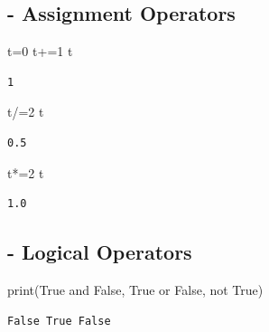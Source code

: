 \documentclass[
  a4paper,
  DIV=11,
  numbers=noendperiod]{scrreprt}
\newenvironment{Shaded}{\begin{snugshade}}{\end{snugshade}}
\newcommand{\BuiltInTok}[1]{\textcolor[rgb]{0.00,0.23,0.31}{#1}}
\newcommand{\DecValTok}[1]{\textcolor[rgb]{0.68,0.00,0.00}{#1}}
\newcommand{\KeywordTok}[1]{\textcolor[rgb]{0.00,0.23,0.31}{#1}}
\newcommand{\NormalTok}[1]{\textcolor[rgb]{0.00,0.23,0.31}{#1}}
\newcommand{\OperatorTok}[1]{\textcolor[rgb]{0.37,0.37,0.37}{#1}}
\newcommand{\VariableTok}[1]{\textcolor[rgb]{0.07,0.07,0.07}{#1}}
\begin{document}
\subsection{- Assignment Operators}\label{assignment-operators}

\begin{Shaded}
\begin{Highlighting}[]
\NormalTok{t}\OperatorTok{=}\DecValTok{0}
\NormalTok{t}\OperatorTok{+=}\DecValTok{1}
\NormalTok{t}
\end{Highlighting}
\end{Shaded}

\begin{verbatim}
1
\end{verbatim}

\begin{Shaded}
\begin{Highlighting}[]
\NormalTok{t}\OperatorTok{/=}\DecValTok{2}
\NormalTok{t}
\end{Highlighting}
\end{Shaded}

\begin{verbatim}
0.5
\end{verbatim}

\begin{Shaded}
\begin{Highlighting}[]
\NormalTok{t}\OperatorTok{*=}\DecValTok{2}
\NormalTok{t}
\end{Highlighting}
\end{Shaded}

\begin{verbatim}
1.0
\end{verbatim}

\subsection{- Logical Operators}\label{logical-operators}

\begin{Shaded}
\begin{Highlighting}[]
\BuiltInTok{print}\NormalTok{(}\VariableTok{True} \KeywordTok{and} \VariableTok{False}\NormalTok{, }\VariableTok{True} \KeywordTok{or} \VariableTok{False}\NormalTok{, }\KeywordTok{not} \VariableTok{True}\NormalTok{)}
\end{Highlighting}
\end{Shaded}

\begin{verbatim}
False True False
\end{verbatim}
\end{document}
